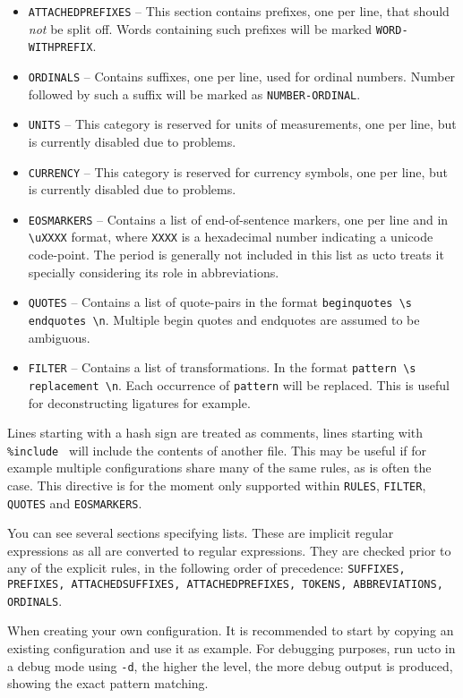\documentclass[a4paper,12pt]{report}
\begin{document}
\begin{itemize}
\item \texttt{ATTACHEDPREFIXES} -- This section contains prefixes, one per line, that should \emph{not} be split off. Words containing such prefixes will be marked \texttt{WORD-WITHPREFIX}.
\item \texttt{ORDINALS} -- Contains suffixes, one per line, used for ordinal numbers. Number followed by such a suffix will be marked as \texttt{NUMBER-ORDINAL}.
\item \texttt{UNITS} -- This category is reserved for units of measurements, one per line, but is currently disabled due to problems.
\item \texttt{CURRENCY} -- This category is reserved for currency symbols, one per line, but is currently disabled due to problems.
\item \texttt{EOSMARKERS} -- Contains a list of end-of-sentence markers, one per line and in \texttt{{\textbackslash}uXXXX} format, where \texttt{XXXX} is a hexadecimal number indicating a unicode code-point. The period is generally not included in this list as ucto treats it specially considering its role in abbreviations.
\item \texttt{QUOTES} -- Contains a list of quote-pairs in the format \texttt{beginquotes {\textbackslash}s endquotes {\textbackslash}n}. Multiple begin quotes and endquotes are assumed to be ambiguous.
\item \texttt{FILTER} -- Contains a list of transformations. In the format \texttt{pattern {\textbackslash}s replacement {\textbackslash}n}. Each occurrence of \texttt{pattern} will be replaced. This is useful for deconstructing ligatures for example. 
\end{itemize}

Lines starting with a hash sign are treated as comments, lines starting with \texttt{\%include } will include the contents of another file. This may be useful if for example multiple configurations share many of the same rules, as is often the case.  This directive is for the moment only supported within \texttt{RULES}, \texttt{FILTER}, \texttt{QUOTES} and \texttt{EOSMARKERS}.

You can see several sections specifying lists. These are implicit regular expressions as all are converted to regular expressions. They are checked prior to any of the explicit rules, in the following order of precedence: \texttt{SUFFIXES, PREFIXES, ATTACHEDSUFFIXES, ATTACHEDPREFIXES, TOKENS, ABBREVIATIONS, ORDINALS}.

When creating your own configuration. It is recommended to start by copying an existing configuration and use it as example. For debugging purposes, run ucto in a debug mode using \texttt{-d}, the higher the level, the more debug output is produced, showing the exact pattern matching.
\end{document}
